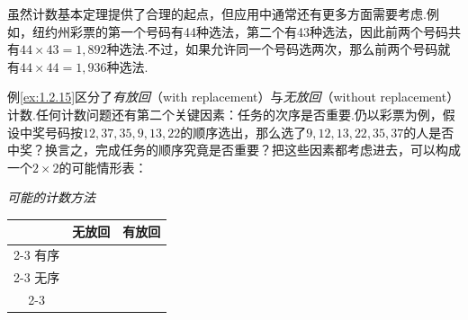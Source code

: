 \begin{example}[彩票——II]\label{ex:1.2.15}
虽然计数基本定理提供了合理的起点，但应用中通常还有更多方面需要考虑.例如，纽约州彩票的第一个号码有44种选法，第二个有43种选法，因此前两个号码共有$44\times43=1,892$种选法.不过，如果允许同一个号码选两次，那么前两个号码就有$44\times44=1,936$种选法.
\end{example}
例\ref{ex:1.2.15}区分了\emph{有放回}（with replacement）与\emph{无放回}（without replacement）计数.任何计数问题还有第二个关键因素：任务的次序是否重要.仍以彩票为例，假设中奖号码按$12,37,35,9,13,22$的顺序选出，那么选了$9,12,13,22,35,37$的人是否中奖？换言之，完成任务的顺序究竟是否重要？把这些因素都考虑进去，可以构成一个$2\times2$的可能情形表：
\begin{center}
\emph{可能的计数方法}\\[3pt]
\begin{tabular}{c|c|c|}
 & 无放回 & 有放回\\\cline{2-3}
有序 & \hspace{2cm} & \hspace{2cm}\\\cline{2-3}
无序 & & \\\cline{2-3}
\end{tabular}
\end{center}


